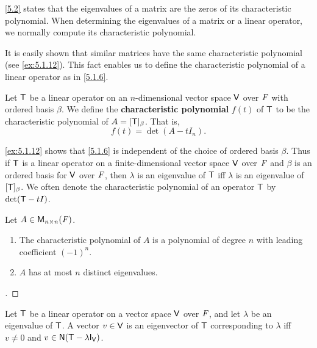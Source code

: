 \begin{note}
  \cref{5.2} states that the eigenvalues of a matrix are the zeros of its characteristic polynomial.
  When determining the eigenvalues of a matrix or a linear operator, we normally compute its characteristic polynomial.
\end{note}

\begin{note}
  It is easily shown that similar matrices have the same characteristic polynomial (see \cref{ex:5.1.12}).
  This fact enables us to define the characteristic polynomial of a linear operator as in \cref{5.1.6}.
\end{note}

\begin{defn}\label{5.1.6}
  Let \(\mathsf{T}\) be a linear operator on an \(n\)-dimensional vector space \(\mathsf{V}\) over \(\mathit{F}\) with ordered basis \(\beta\).
  We define the \textbf{characteristic polynomial} \(f(t)\) of \(\mathsf{T}\) to be the characteristic polynomial of \(A = [\mathsf{T}]_{\beta}\).
  That is,
  \[
    f(t) = \det(A - t I_n).
  \]
\end{defn}

\begin{note}
  \cref{ex:5.1.12} shows that \cref{5.1.6} is independent of the choice of ordered basis \(\beta\).
  Thus if \(\mathsf{T}\) is a linear operator on a finite-dimensional vector space \(\mathsf{V}\) over \(\mathit{F}\) and \(\beta\) is an ordered basis for \(\mathsf{V}\) over \(\mathit{F}\), then \(\lambda\) is an eigenvalue of \(\mathsf{T}\) iff \(\lambda\) is an eigenvalue of \([\mathsf{T}]_{\beta}\).
  We often denote the characteristic polynomial of an operator \(\mathsf{T}\) by \(\det(\mathsf{T} - tI)\).
\end{note}

\begin{thm}\label{5.3}
  Let \(A \in \mathsf{M}_{{n} \times n}({\mathit{F}})\).
  \begin{enumerate}
    \item The characteristic polynomial of \(A\) is a polynomial of degree \(n\) with leading coefficient \((-1)^n\).
    \item \(A\) has at most \(n\) distinct eigenvalues.
  \end{enumerate}
\end{thm}

\begin{proof}[]

\end{proof}

\begin{thm}\label{5.4}
  Let \(\mathsf{T}\) be a linear operator on a vector space \(\mathsf{V}\) over \(\mathit{F}\), and let \(\lambda\) be an eigenvalue of \(\mathsf{T}\).
  A vector \(v \in \mathsf{V}\) is an eigenvector of \(\mathsf{T}\) corresponding to \(\lambda\) iff \(v \neq 0\) and \(v \in \ns{\T - \lambda \IT[\V]}\).
\end{thm}

